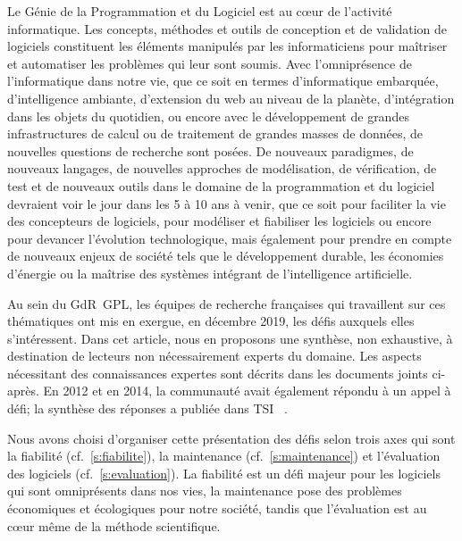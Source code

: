 \documentclass[11pt]{article}
\newcommand{\GDR}{GdR}
\newcommand{\cf}[0]{cf.~}
\begin{document}
Le Génie de la Programmation et du Logiciel est au c{\oe}ur de l'activité
informatique. Les concepts, méthodes et outils de conception et de
validation de logiciels constituent les éléments manipulés par les
informaticiens pour maîtriser et automatiser les problèmes qui leur sont 
soumis. Avec l'omniprésence de l'informatique dans notre vie,  que ce soit en termes
d'informatique embarquée, d'intelligence ambiante, d'extension du web au niveau
de la planète, d'intégration dans les objets du quotidien, ou encore avec le
développement de grandes infrastructures de calcul ou de traitement de grandes
masses de données, de nouvelles questions de recherche sont posées.
De nouveaux paradigmes, de nouveaux langages, de nouvelles approches de
modélisation, de vérification, de test et de nouveaux outils dans le domaine
de la programmation et du logiciel devraient voir le jour dans les 5 à 10 ans à
venir, que ce soit pour faciliter la vie des concepteurs de logiciels, pour
modéliser et fiabiliser les logiciels ou encore pour devancer l'évolution
technologique, mais également pour prendre en compte de nouveaux enjeux de
société tels que le développement durable, les économies d'énergie ou la maîtrise des systèmes intégrant de l'intelligence artificielle.

Au sein du {\GDR}~GPL, les équipes de recherche françaises qui travaillent sur ces thématiques ont mis en exergue, en décembre 2019, les défis auxquels elles s'intéressent. Dans cet article, nous en proposons une synthèse, non exhaustive, à destination de lecteurs non nécessairement experts du domaine. Les aspects %
nécessitant des connaissances expertes sont décrits dans les documents joints ci-après. En 2012 et en 2014, la communauté avait également répondu à un appel à défi; la synthèse des réponses a  publiée dans TSI ~\cite{collet:hal-01345654, duchien:hal-00712942}.


Nous avons choisi d'organiser cette présentation des défis selon trois axes qui sont la fiabilité (\cf\ref{s:fiabilite}), la maintenance (\cf\ref{s:maintenance}) et l'évaluation des logiciels (\cf\ref{s:evaluation}). La fiabilité est un défi majeur pour les logiciels qui sont omniprésents dans nos vies, la maintenance pose des problèmes économiques et écologiques pour notre société, tandis que l'évaluation est au c{\oe}ur même de la méthode scientifique.
\end{document}
